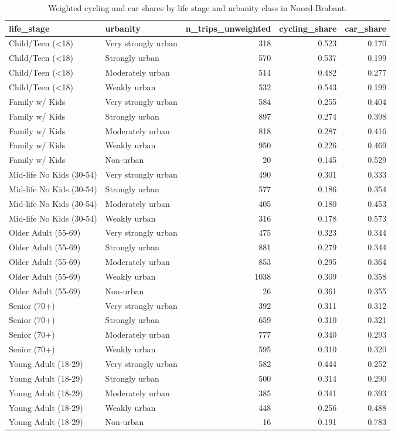 \begin{table}
\caption{Weighted cycling and car shares by life stage and urbanity class in Noord-Brabant.}
\label{tab:cycling_life_stage_urbanity}
\begin{tabular}{llrrr}
\toprule
life\_stage & urbanity & n\_trips\_unweighted & cycling\_share & car\_share \\
\midrule
Child/Teen (<18) & Very strongly urban & 318 & 0.523 & 0.170 \\
Child/Teen (<18) & Strongly urban & 570 & 0.537 & 0.199 \\
Child/Teen (<18) & Moderately urban & 514 & 0.482 & 0.277 \\
Child/Teen (<18) & Weakly urban & 532 & 0.543 & 0.199 \\
Family w/ Kids & Very strongly urban & 584 & 0.255 & 0.404 \\
Family w/ Kids & Strongly urban & 897 & 0.274 & 0.398 \\
Family w/ Kids & Moderately urban & 818 & 0.287 & 0.416 \\
Family w/ Kids & Weakly urban & 950 & 0.226 & 0.469 \\
Family w/ Kids & Non-urban & 20 & 0.145 & 0.529 \\
Mid-life No Kids (30-54) & Very strongly urban & 490 & 0.301 & 0.333 \\
Mid-life No Kids (30-54) & Strongly urban & 577 & 0.186 & 0.354 \\
Mid-life No Kids (30-54) & Moderately urban & 405 & 0.180 & 0.453 \\
Mid-life No Kids (30-54) & Weakly urban & 316 & 0.178 & 0.573 \\
Older Adult (55-69) & Very strongly urban & 475 & 0.323 & 0.344 \\
Older Adult (55-69) & Strongly urban & 881 & 0.279 & 0.344 \\
Older Adult (55-69) & Moderately urban & 853 & 0.295 & 0.364 \\
Older Adult (55-69) & Weakly urban & 1038 & 0.309 & 0.358 \\
Older Adult (55-69) & Non-urban & 26 & 0.361 & 0.355 \\
Senior (70+) & Very strongly urban & 392 & 0.311 & 0.312 \\
Senior (70+) & Strongly urban & 659 & 0.310 & 0.321 \\
Senior (70+) & Moderately urban & 777 & 0.340 & 0.293 \\
Senior (70+) & Weakly urban & 595 & 0.310 & 0.320 \\
Young Adult (18-29) & Very strongly urban & 582 & 0.444 & 0.252 \\
Young Adult (18-29) & Strongly urban & 500 & 0.314 & 0.290 \\
Young Adult (18-29) & Moderately urban & 385 & 0.341 & 0.393 \\
Young Adult (18-29) & Weakly urban & 448 & 0.256 & 0.488 \\
Young Adult (18-29) & Non-urban & 16 & 0.191 & 0.783 \\
\bottomrule
\end{tabular}
\end{table}
